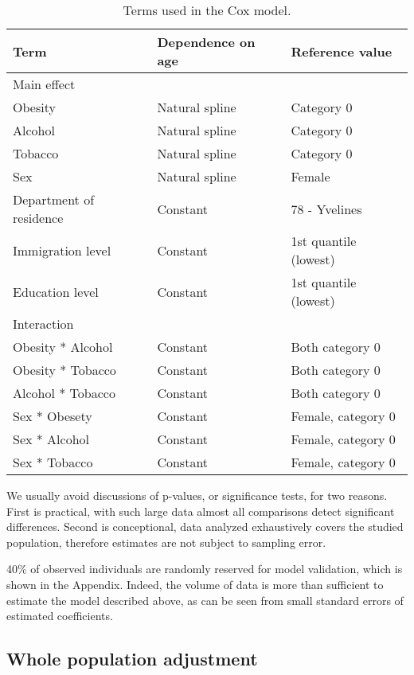 \documentclass{article}
\begin{document}
\begin{table}\begin{longtable}{lll}
\caption{
\label{tab:cox_terms}Terms used in the Cox model.
} \\ 
\toprule
Term & Dependence on age & Reference value \\ 
\midrule
\multicolumn{3}{l}{Main effect} \\ 
\midrule
Obesity & Natural spline & Category 0 \\ 
Alcohol & Natural spline & Category 0 \\ 
Tobacco & Natural spline & Category 0 \\ 
Sex & Natural spline & Female \\ 
Department of residence & Constant & 78 - Yvelines \\ 
Immigration level & Constant & 1st quantile (lowest) \\ 
Education level & Constant & 1st quantile (lowest) \\ 
\midrule
\multicolumn{3}{l}{Interaction} \\ 
\midrule
Obesity * Alcohol & Constant & Both category 0 \\ 
Obesity * Tobacco & Constant & Both category 0 \\ 
Alcohol * Tobacco & Constant & Both category 0 \\ 
Sex * Obesety & Constant & Female, category 0 \\ 
Sex * Alcohol & Constant & Female, category 0 \\ 
Sex * Tobacco & Constant & Female, category 0 \\ 
\bottomrule
\end{longtable}
\end{table}

We usually avoid discussions of p-values, or significance tests, for two
reasons. First is practical, with such large data almost all comparisons
detect significant differences. Second is conceptional, data analyzed
exhaustively covers the studied population, therefore estimates are not
subject to sampling error.

40\% of observed individuals are randomly reserved for model validation,
which is shown in the Appendix. Indeed, the volume of data is more than
sufficient to estimate the model described above, as can be seen from
small standard errors of estimated coefficients.

\hypertarget{whole-population-adjustment}{%
\subsection{\texorpdfstring{Whole population adjustment
\label{sec:whole_pop_adj}}{Whole population adjustment }}\label{whole-population-adjustment}}
\end{document}

